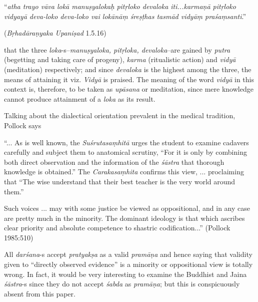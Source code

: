\begin{myquote}
``{\sl atha trayo vāva lokā manuṣyalokaḥ pitṛloko devaloka iti...karmaṇā pitṛloko vidyayā deva-loko deva-loko vai lokānāṃ śreṣṭhas tasmād vidyāṃ praśaṃsanti}.'' 

\hfill({\sl Bṛhadāraṇyaka Upaniṣad} 1.5.16)
\end{myquote}
that the three {\sl loka}-s--{\sl manuṣyaloka, pitṛloka, devaloka}--are gained by {\sl putra} (begetting and taking care of progeny), {\sl karma} (ritualistic action) and {\sl vidyā} (meditation) respectively; and since {\sl devaloka } is the highest among the three, the means of attaining it viz. {\sl Vidyā} is praised. The meaning of the word {\sl vidyā} in this context is, therefore, to be taken as {\sl upāsana} or meditation, since mere knowledge cannot produce attainment of a {\sl loka} as its result.

Talking about the dialectical orientation prevalent in the medical tradition, Pollock says
\begin{myquote}
``... As is well known, the {\sl Suśrutasaṃhitā} urges the student to examine cadavers carefully and subject them to anatomical scrutiny, ``For it is only by combining both direct observation and the information of the {\sl śāstra} that thorough knowledge is obtained.'' The {\sl Carakasaṃhita} conﬁrms this view, ... proclaiming that ``The wise understand that their best teacher is the very world around them.''

Such voices ... may with some justice be viewed as oppositional, and in any case are pretty much in the minority. The dominant ideology is that which ascribes clear priority and absolute competence to shastric codiﬁcation...'' (Pollock 1985:510)
\end{myquote}

All {\sl darśana}-s accept {\sl pratyakṣa} as a valid {\sl pramāṇa} and hence saying that validity given to ``directly observed evidence'' is a minority or oppositional view is totally wrong. In fact, it  would be very interesting to examine the Buddhist and Jaina {\sl śāstra}-s since they do not accept {\sl śabda} as {\sl pramāṇa}; but this is conspicuously absent from this paper.

